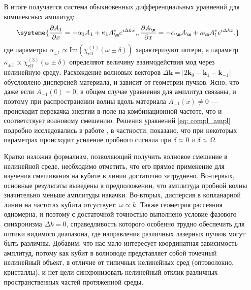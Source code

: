 В итоге получается система обыкновенных дифференциальных уравнений для комплексных амплитуд:
\begin{equation}
\systeme{
\frac{\partial A_1}{\partial x} = -\alpha_1 A_1 + \kappa_1A^*_{\m} e^{i\Delta k x}\text{,},
\frac{\partial A_{\m}}{\partial x} = -\alpha_{\m} A_{\m} + \kappa_{\m}A^*_1 e^{i\Delta k x}.
\label{eq: compl_ampl}}
\end{equation}
где параметры $\alpha_{\pm1}\propto\text{Im}\left(\chi^{(1)}_{\text{eff}}(\omega\pm\delta)\right)$ характеризуют потери, а параметр $ \kappa_{\pm1}\propto\chi^{(3)}_{\text{eff}}(\omega\pm\delta)$ определяют величину взаимодействия мод через нелинейную среду. Расхождение волновых векторов $\Delta \textbf{k} = |2\textbf{k}_0 - \textbf{k}_1 - \textbf{k}_{-1} |$ обусловлено дисперсией материала, и зависит от геометрии пучков. Ясно, что даже если $A_{-1}(0) = 0$, в общем случае уравнения для амплитуд связаны, и поэтому при распространении волны вдоль материала $A_{-1}(x) \ne 0$ --- происходит перекачка энергии в поле на комбинационной частоте, что и соответствует волновому смешению. 
Решения уравнений \eqref{eq: compl_ampl} подробно исследовались в работе \cite[]{Boyd_WM_81}, в частности, показано, что при некоторых параметрах происходит усиление пробного сигнала при $\delta \approx 0$ и $\delta \approx \Omega$.

Кратко изложив формализм, позволяющий получить волновое смешение в нелинейной среде, необходимо отметить, что его прямое применение для изучения смешивания на кубите в линии достаточно затруднено. Во-первых, основные результаты выведены в предположении, что амплитуда пробной волны значительно меньше амплитуды накачки. Во-вторых, дисперсия в копланарной линии на частотах кубита отсуствует: $\omega \propto k$. Также геометрия рассеяния одномерна, и поэтому с достаточной точностью выполнено условие фазового синхронизма $\Delta k =0$, справедливость которого особенно трудно обеспечить для оптики видимого диапазона, где направления различных лазерных пучков могут быть различны. Добавим, что нас мало интересует координатная зависимость амплитуд, потому как кубит в волноводе представляет собой точечный нелинейный объект, в отличие от типичных нелинейных сред (оптоволокно, кристаллы), и нет цели синхронизовать нелинейный отклик различных пространственных частей протяженной среды. 

